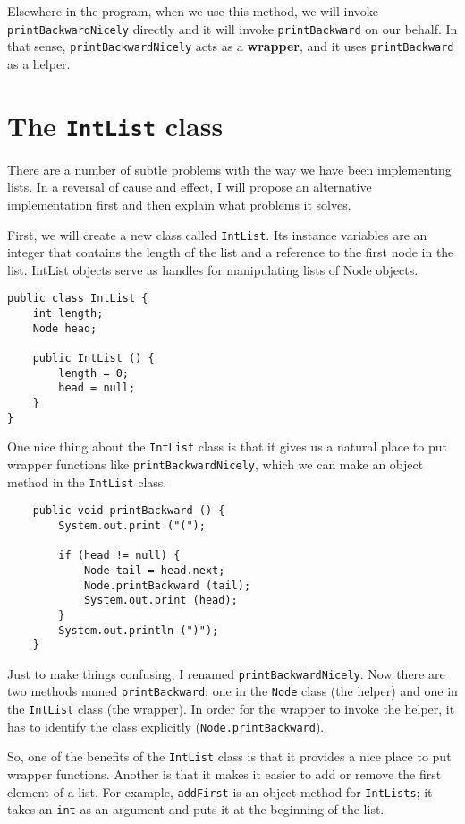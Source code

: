 
Elsewhere in the program, when we use this method, we will
invoke {\tt printBackwardNicely} directly and it will invoke
{\tt printBackward} on our behalf.  In that sense, 
{\tt printBackwardNicely} acts as a {\bf wrapper}, and it uses
{\tt printBackward} as a helper.


\section {The {\tt IntList} class}

There are a number of subtle problems with the way we have been
implementing lists.  In a reversal of cause and effect, I will
propose an alternative implementation first and then explain what
problems it solves.

First, we will create a new class called {\tt IntList}.  Its
instance variables are an integer that contains the length of the list
and a reference to the first node in the list.  IntList objects
serve as handles for manipulating lists of Node objects.

\begin{verbatim}
public class IntList {
    int length;
    Node head;

    public IntList () {
        length = 0;
        head = null;
    }
}
\end{verbatim}
%
One nice thing about the {\tt IntList} class is that it gives
us a natural place to put wrapper functions like
{\tt printBackwardNicely}, which we can make an object
method in the {\tt IntList} class.

\begin{verbatim}
    public void printBackward () {
        System.out.print ("(");

        if (head != null) {
            Node tail = head.next;
            Node.printBackward (tail);
            System.out.print (head);
        }
        System.out.println (")");
    }	
\end{verbatim}
%
Just to make things confusing, I renamed {\tt printBackwardNicely}.
Now there are two methods named {\tt printBackward}: one in the
{\tt Node} class (the helper) and one in the {\tt IntList} class
(the wrapper).  In order for the wrapper to invoke the helper, it has
to identify the class explicitly ({\tt Node.printBackward}).

So, one of the benefits of the {\tt IntList} class is that
it provides a nice place to put wrapper functions.
Another is that it makes it easier to add or remove
the first element of a list.  For example, {\tt addFirst}
is an object method for {\tt IntLists}; it
takes an {\tt int} as an argument and puts it at the beginning of
the list.

